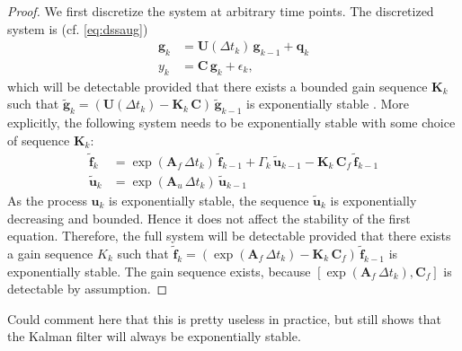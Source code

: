 \documentclass[journal]{IEEEtran}
\newcommand{\simo}[1]{{\color{red}#1}}
\begin{document}
\begin{proof}
We first discretize the system at arbitrary time points. The discretized system is (cf. \eqref{eq:dssaug})
%
\begin{equation}
\begin{split}
   \mathbf{g}_k &= \mathbf{U}(\Delta t_k) \, \mathbf{g}_{k-1} +  \mathbf{q}_k \\
  y_k &=  \mathbf{C} \,  \mathbf{g}_k + \epsilon_k,
\end{split}
\end{equation}
%
which will be detectable provided that there exists a bounded gain sequence $\mathbf{K}_k$ such that $\tilde{\mathbf{g}}_k = (\mathbf{U}(\Delta t_k) - \mathbf{K}_k \, \mathbf{C}) \, \tilde{\mathbf{g}}_{k-1}$ is exponentially stable \cite{Anderson:1981}. More explicitly, the following system needs to be exponentially stable with some choice of sequence $\mathbf{K}_k$:
%
\begin{equation}
\begin{split}
  \tilde{\mathbf{f}}_k &= \exp(\mathbf{A}_f \, \Delta t_k) \, \tilde{\mathbf{f}}_{k-1}
  + \Gamma_k \, \tilde{\mathbf{u}}_{k-1} - \mathbf{K}_k \, \mathbf{C}_f \, \tilde{\mathbf{f}}_{k-1} \\
  \tilde{\mathbf{u}}_k &= \exp(\mathbf{A}_u \, \Delta t_k) \, \tilde{\mathbf{u}}_{k-1} 
\end{split}
\end{equation}
%
As the process $\mathbf{u}_k$ is exponentially stable, the sequence $\tilde{\mathbf{u}}_k$ is exponentially decreasing and bounded. Hence it does not affect the stability of the first equation. Therefore, the full system will be detectable provided that there exists a gain sequence $K_k$ such that $\tilde{\mathbf{f}}_k = (\exp(\mathbf{A}_f \, \Delta t_k) - \mathbf{K}_k \, \mathbf{C}_f) \, \tilde{\mathbf{f}}_{k-1}$ is exponentially stable. The gain sequence exists, because $[\exp(\mathbf{A}_f \, \Delta t_k),\mathbf{C}_f]$ is detectable by assumption. 
\end{proof}

\simo{Could comment here that this is pretty useless in practice, but still shows that the Kalman filter will always be exponentially stable.}
\end{document}
